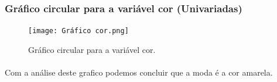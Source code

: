 \documentclass{article}
\begin{document}
\paragraph{}
\paragraph{}
\paragraph{}

\subsubsection{Gráfico circular para a variável cor (Univariadas)}
\begin{figure}[h]
       \centering %
        \texttt{[image: Gráfico cor.png]}
       \caption{Gráfico circular para a variável cor.}
       \label{fig:logo}
    \end{figure}

\paragraph{} Com a análise deste grafico podemos concluir que a moda é a cor amarela.

\paragraph{} 

\paragraph{}

\paragraph{}

\paragraph{}

\paragraph{}

\paragraph{}
\end{document}
